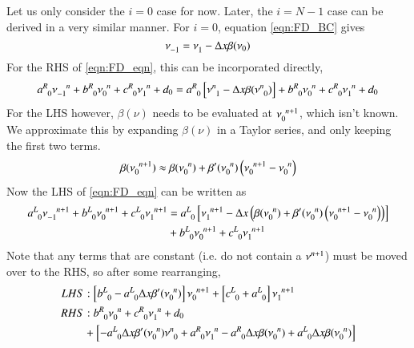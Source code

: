 \documentclass[letterpaper,12pt]{article}
\begin{document}
Let us only consider the $i=0$ case for now. Later, the $i=N-1$ case can be derived in a very similar manner. For $i=0$, equation \ref{eqn:FD_BC} gives
\begin{equation}
  \nu\indices{_{-1}} = \nu\indices{_{1}} - \Delta x \beta(\nu_0)
\end{equation}
For the RHS of \ref{eqn:FD_eqn}, this can be incorporated directly,
\begin{equation}
  \label{eqn:lhs}
  a\indices{^R_0} \nu\indices{_{-1}^{n  }}
+ b\indices{^R_0} \nu\indices{_{ 0}^{n  }}
+ c\indices{^R_0} \nu\indices{_{ 1}^{n  }}
+ d_0
=
  a\indices{^R_0} \left[\nu\indices{^{n}_{1}} - \Delta x \beta(\nu\indices{^{n}_{0}})\right]
+ b\indices{^R_0} \nu\indices{_{ 0}^{n  }}
+ c\indices{^R_0} \nu\indices{_{ 1}^{n  }}
+ d_0
\end{equation}
For the LHS however, $\beta\left(\nu\right)$ needs to be evaluated at $\nu\indices{_{0}^{n+1}}$, which isn't known. We approximate this by expanding $\beta\left(\nu\right)$ in a Taylor series, and only keeping the first two terms.
\begin{equation}
  \beta(\nu\indices{_{0}^{n+1}}) \approx \beta (\nu\indices{_{0}^{n}})
                                      +  \beta'(\nu\indices{_{0}^{n}}) \left( \nu\indices{_{0}^{n+1}} - \nu\indices{_{0}^{n}} \right)
\end{equation}
Now the LHS of \ref{eqn:FD_eqn} can be written as
\begin{align}
  \label{eqn:rhs}
  a\indices{^L_0} \nu\indices{_{-1}^{n+1}}
+ b\indices{^L_0} \nu\indices{_{0 }^{n+1}}
+ c\indices{^L_0} \nu\indices{_{ 1}^{n+1}}
&=
a\indices{^L_0} \left[ \nu\indices{_{1}^{n+1}}
                    - \Delta x \left(\beta (\nu\indices{_{0}^{n}})
                               +     \beta'(\nu\indices{_{0}^{n}}) \left( \nu\indices{_{0}^{n+1}} - \nu\indices{_{0}^{n}} \right) \right)
               \right] \nonumber \\
&+ b\indices{^L_0} \nu\indices{_{0  }^{n+1}}
 + c\indices{^L_0} \nu\indices{_{  1}^{n+1}}
\end{align}
Note that any terms that are constant (i.e. do not contain a $\nu\indices{^{n+1}}$) must be moved over to the RHS, so after
some rearranging,
\begin{align}
  \label{eqn:minLHS}
  LHS&: 
  \left[b\indices{^L_0} - a\indices{^L_0}\Delta x \beta'(\nu\indices{_{0}^n}) \right] \nu\indices{_0^{n+1}}
+ \left[c\indices{^L_0} + a\indices{^L_0}                                             \right] \nu\indices{_1^{n+1}} \\
  \label{eqn:minRHS}
  RHS&:
  b\indices{^R_0}\nu\indices{_0^n}
+ c\indices{^R_0}\nu\indices{_1^n}
+ d_0 \nonumber \\
&+
\left[
- a\indices{^L_0} \Delta x \beta'(\nu\indices{_0^n}) \nu\indices{^n_0}
+ a\indices{^R_0}                 \nu\indices{_1^n} 
- a\indices{^R_0} \Delta x \beta (\nu\indices{_0^n})
+ a\indices{^L_0} \Delta x \beta (\nu\indices{_0^n})
\right]
\end{align}
\end{document}
